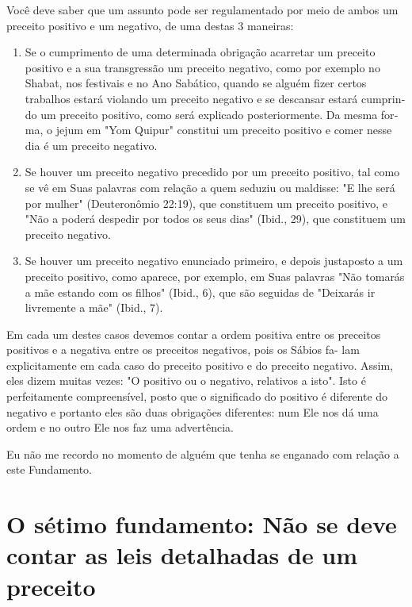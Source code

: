 \begin{itemize}
\begin{enumrate}
Você deve saber que um assunto pode ser regulamentado por meio de ambos
um preceito positivo e um negativo, de uma destas 3 maneiras:


\begin{enumerate}
\def\labelenumi{\arabic{enumi}.}
\item
 
 Se o cumprimento de uma determinada obrigação acarretar um preceito
 positivo e a sua transgressão um preceito negativo, como por exem­plo
 no Shabat, nos festivais e no Ano Sabático, quando se alguém fizer
 certos trabalhos estará violando um preceito negativo e se descansar
 estará cumprin­do um preceito positivo, como será explicado
 posteriormente. Da mesma for­ma, o jejum em "Yom Quipur" constitui um
 preceito positivo e comer nesse dia é um preceito negativo.
 
\item
 
 Se houver um preceito negativo precedido por um preceito posi­tivo,
 tal como se vê em Suas palavras com relação a quem seduziu ou
 maldisse: "E lhe será por mulher" (Deuteronômio 22:19), que constituem
 um preceito positivo, e "Não a poderá despedir por todos os seus dias"
 (Ibid., 29), que cons­tituem um preceito negativo.
 
\item
 
 Se houver um preceito negativo enunciado primeiro, e depois
 jus­taposto a um preceito positivo, como aparece, por exemplo, em Suas
 palavras "Não tomarás a mãe estando com os filhos" (Ibid., 6), que são
 seguidas de "Dei­xarás ir livremente a mãe" (Ibid., 7).
 
\end{enumerate}


Em cada um destes casos devemos contar a ordem positiva entre os
preceitos positivos e a negativa entre os preceitos negativos, pois os
Sábios fa-
lam explicitamente em cada caso do preceito positivo e do preceito
negativo. Assim, eles dizem muitas vezes: "O positivo ou o negativo,
relativos a isto". Isto é perfeitamente compreensível, posto que o
significado do positivo é dife­rente do negativo e portanto eles são
duas obrigações diferentes: num Ele nos dá uma ordem e no outro Ele nos
faz uma advertência.

Eu não me recordo no momento de alguém que tenha se enganado com relação
a este Fundamento.

\chapter{O sétimo fundamento: Não se deve contar as leis detalhadas de um preceito}


\end{enumrate}
\end{itemize}
